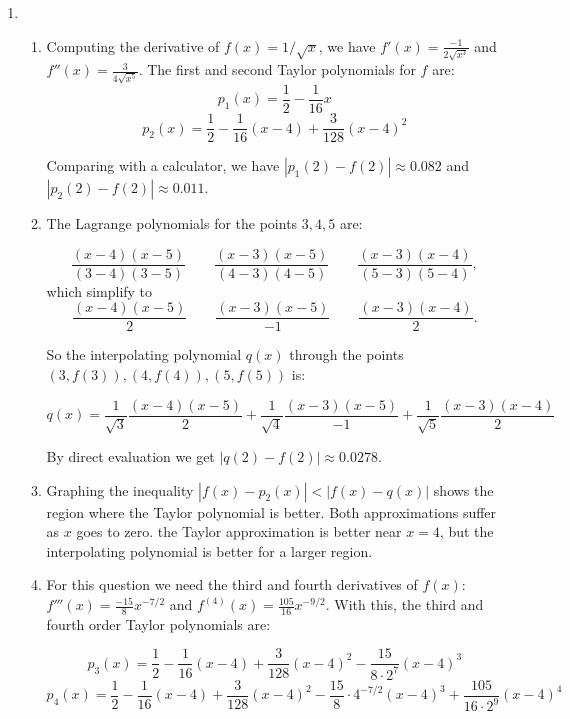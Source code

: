\begin{enumerate}
	\item \begin{enumerate}
		      \item Computing the derivative of $f(x) = 1/\sqrt{x}$, we have $f'(x) = \frac{-1}{2\sqrt{x^3}}$ and $f''(x) = \frac{3}{4\sqrt{x^5}}$.
		            The first and second Taylor polynomials for $f$ are:
		            \[p_1(x) = \frac{1}{2} -\frac{1}{16}x\]
		            \[p_2(x) = \frac{1}{2} -\frac{1}{16}(x-4) + \frac{3}{128}(x-4)^2\]

		            Comparing with a calculator, we have $|p_1(2) - f(2)| \approx 0.082$ and $|p_2(2) - f(2)| \approx 0.011$.

		      \item The Lagrange polynomials for the points $3,4,5$ are:

		            \[
			            \frac{(x-4)(x-5)}{(3-4)(3-5)}\qquad \frac{(x-3)(x-5)}{(4-3)(4-5)}
			            \qquad \frac{(x-3)(x-4)}{(5-3)(5-4)},
		            \]
		            which simplify to
		            \[
			            \frac{(x-4)(x-5)}{2}\qquad \frac{(x-3)(x-5)}{-1}\qquad \frac{(x-3)(x-4)}{2}.
		            \]

		            So the interpolating polynomial $q(x)$ through the points $(3,f(3)),(4,f(4)),(5,f(5))$ is:

		            \[q(x) = \frac{1}{\sqrt{3}}\frac{(x-4)(x-5)}{2} + \frac{1}{\sqrt{4}}\frac{(x-3)(x-5)}{-1} + \frac{1}{\sqrt{5}}\frac{(x-3)(x-4)}{2}\]

		            By direct evaluation we get $|q(2)-f(2)| \approx 0.0278$.

		      \item Graphing the inequality $|f(x) - p_2(x)| < |f(x) - q(x)|$ shows the region where the Taylor polynomial is better. Both approximations suffer as $x$ goes to zero. the Taylor approximation is better near $x=4$, but the interpolating polynomial is better for a larger region.

		      \item For this question we need the third and fourth derivatives of $f(x)$: $f'''(x) = \frac{-15}{8}x^{-7/2}$ and $f^{(4)}(x) = \frac{105}{16}x^{-9/2}$. With this, the third and fourth order Taylor polynomials are:

		            \[p_3(x) = \frac{1}{2} -\frac{1}{16}(x-4) + \frac{3}{128}(x-4)^2 -\frac{15}{8\cdot 2^7} (x-4)^3\]
		            \[p_4(x) = \frac{1}{2} -\frac{1}{16}(x-4) + \frac{3}{128}(x-4)^2 -\frac{15}{8}\cdot 4^{-7/2}(x-4)^3 + \frac{105}{16 \cdot 2^9}(x-4)^4\]


\end{enumerate}
\end{enumerate}
